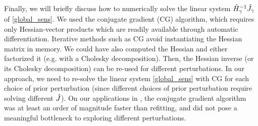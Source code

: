 Finally, we will briefly discuss how to numerically solve the linear system
$\hat{H}_\gamma^{-1}\hat J_\gamma$ of \eqref{global_sens}.  We used the
conjugate gradient (CG) algorithm, which requires only Hessian-vector products
which are readily available through automatic differentiation. Iterative methods
such as CG avoid instantiating the Hessian matrix in memory. We could have also
computed the Hessian and either factorized it (e.g. with a Cholesky
decomposition). Then, the Hessian inverse (or its Cholesky decomposition) can be
re-used for different perturbations. In our approach, we need to re-solve the
linear system \eqref{global_sens} with CG for each choice of prior perturbation
(since different choices of prior perturbation require solving different
$\hat J$). On our applications in , the conjugate
gradient algorithm was at least an order of magnitude faster than refitting, and
did not pose a meaningful bottleneck to exploring different perturbations.
